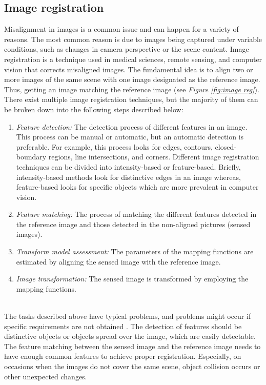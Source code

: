 \subsection{Image registration}
Misalignment in images is a common issue and can happen for a variety of reasons. The most common reason is due to images being captured under variable conditions, such as changes in camera perspective or the scene content. Image registration \cite{Nag} is a technique used in medical sciences, remote sensing, and computer vision that corrects misaligned images. The fundamental idea is to align two or more images of the same scene with one image designated as the reference image. Thus, getting an image matching the reference image (see \textit{Figure \ref{fig:image reg}}). There exist multiple image registration techniques, but the majority of them can be broken down into the following steps described below: \\
\begin{enumerate}
    \item \textit{Feature detection:} The detection process of different features in an image. This process can be manual or automatic, but an automatic detection is preferable. For example, this process looks for edges, contours, closed-boundary regions, line intersections, and corners. Different image registration techniques can be divided into intensity-based or feature-based. Briefly, intensity-based methods look for distinctive edges in an image whereas, feature-based looks for specific objects which are more prevalent in computer vision. 
    \item \textit{Feature matching:} The process of matching the different features detected in the reference image and those detected in the non-aligned pictures (sensed images). 
    \item \textit{Transform model assessment:} The parameters of the mapping functions are estimated by aligning the sensed image with the reference image. 
    \item \textit{Image transformation:} The sensed image is transformed by employing the mapping functions.
\end{enumerate} 
\ \\
\noindent The tasks described above have typical problems, and problems might occur if specific requirements are not obtained \cite{Zitova}. The detection of features should be distinctive objects or objects spread over the image, which are easily detectable. The feature matching between the sensed image and the reference image needs to have enough common features to achieve proper registration. Especially, on occasions when the images do not cover the same scene, object collision occurs or other unexpected changes. \\

